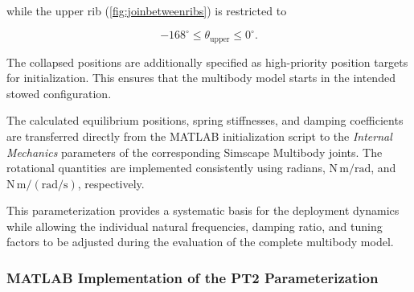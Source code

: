 	while the upper rib (\ref{fig:joinbetweenribs}) is restricted to
	
	\begin{equation}
		-168^\circ
		\leq
		\theta_{\mathrm{upper}}
		\leq
		0^\circ.
	\end{equation}
	
	The collapsed positions are additionally specified as high-priority position targets for initialization. This ensures that the multibody model starts in the intended stowed configuration.
	
	The calculated equilibrium positions, spring stiffnesses, and damping coefficients are transferred directly from the MATLAB initialization script to the \textit{Internal Mechanics} parameters of the corresponding Simscape Multibody joints. The rotational quantities are implemented consistently using radians, $\mathrm{N\,m/rad}$, and $\mathrm{N\,m/(rad/s)}$, respectively.
	
	This parameterization provides a systematic basis for the deployment dynamics while allowing the individual natural frequencies, damping ratio, and tuning factors to be adjusted during the evaluation of the complete multibody model.

	\subsubsection{MATLAB Implementation of the PT2 Parameterization}
	
